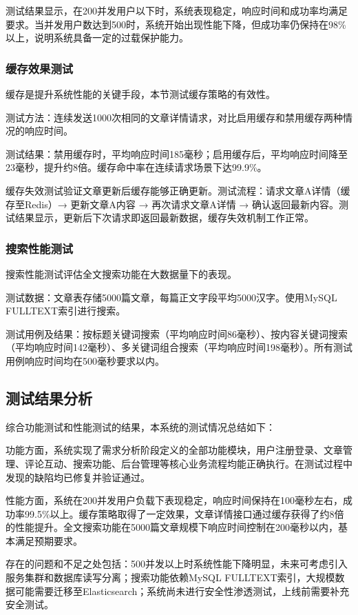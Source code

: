 \documentclass[UTF8,AutoFakeBold=1,AutoFakeSlant,zihao=-4]{SCAU}
\begin{document}
 测试结果显示，在200并发用户以下时，系统表现稳定，响应时间和成功率均满足要求。当并发用户数达到500时，系统开始出现性能下降，但成功率仍保持在98\%以上，说明系统具备一定的过载保护能力。

 \subsubsection{缓存效果测试}

 缓存是提升系统性能的关键手段，本节测试缓存策略的有效性。

 测试方法：连续发送1000次相同的文章详情请求，对比启用缓存和禁用缓存两种情况的响应时间。

 测试结果：禁用缓存时，平均响应时间185毫秒；启用缓存后，平均响应时间降至23毫秒，提升约8倍。缓存命中率在连续请求场景下达99.9\%。

 缓存失效测试验证文章更新后缓存能够正确更新。测试流程：请求文章A详情（缓存至Redis）→ 更新文章A内容 → 再次请求文章A详情 → 确认返回最新内容。测试结果显示，更新后下次请求即返回最新数据，缓存失效机制工作正常。

 \subsubsection{搜索性能测试}

 搜索性能测试评估全文搜索功能在大数据量下的表现。

 测试数据：文章表存储5000篇文章，每篇正文字段平均5000汉字。使用MySQL FULLTEXT索引进行搜索。

 测试用例及结果：按标题关键词搜索（平均响应时间86毫秒）、按内容关键词搜索（平均响应时间142毫秒）、多关键词组合搜索（平均响应时间198毫秒）。所有测试用例响应时间均在500毫秒要求以内。

 \subsection{测试结果分析}

 综合功能测试和性能测试的结果，本系统的测试情况总结如下：

 功能方面，系统实现了需求分析阶段定义的全部功能模块，用户注册登录、文章管理、评论互动、搜索功能、后台管理等核心业务流程均能正确执行。在测试过程中发现的缺陷均已修复并验证通过。

 性能方面，系统在200并发用户负载下表现稳定，响应时间保持在100毫秒左右，成功率99.5\%以上。缓存策略取得了一定效果，文章详情接口通过缓存获得了约8倍的性能提升。全文搜索功能在5000篇文章规模下响应时间控制在200毫秒以内，基本满足预期要求。

 存在的问题和不足之处包括：500并发以上时系统性能下降明显，未来可考虑引入服务集群和数据库读写分离；搜索功能依赖MySQL FULLTEXT索引，大规模数据可能需要迁移至Elasticsearch；系统尚未进行安全性渗透测试，上线前需要补充安全测试。
\end{document}
